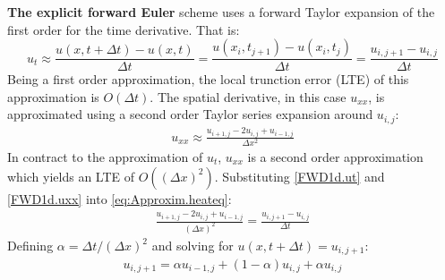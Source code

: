 \documentclass[%
oneside,                 %
final,                   %
10pt]{article}
\begin{document}
\textbf{The explicit forward Euler} scheme uses a forward Taylor expansion of the first order for the time derivative. That is\citep[p. 305]{HJ15}:
\begin{equation}
u_{t} \approx \frac{u(x, t +\Delta t)- u(x,t)}{\Delta t} =\frac{u(x_i, t_{j+1})- u(x_i,t_j)}{\Delta t} =\frac{u_{i,j+1}- u_{i,j}}{\Delta t} \label{FWD1d.ut}
\end{equation}
Being a first order approximation, the local trunction error (LTE) of this approximation is $O(\Delta t)$. The spatial derivative, in this case $u_{xx}$, is approximated using a second order Taylor series expansion around $u_{i,j}$:
\begin{align}
u_{xx} \approx \frac{u_{i+1,j} -2u_{i,j}+u_{i-1,j}}{\Delta x^2} \label{FWD1d.uxx}
\end{align}
In contract to the approximation of $u_t$, $u_{xx}$ is a second order approximation which yields an LTE of $O((\Delta x)^2)$. Substituting \eqref{FWD1d.ut} and \eqref{FWD1d.uxx} into \eqref{eq:Approxim.heateq}:
\begin{align*}
\frac{u_{i+1,j} -2u_{i,j}+u_{i-1,j}}{(\Delta x)^2}=\frac{u_{i,j+1}- u_{i,j}}{\Delta t} 
\end{align*}
Defining $\alpha=\Delta t/(\Delta x)^2$ and solving for $u(x,t+\Delta t)=u_{i,j+1}$:
\begin{align}
u_{i,j+1}= \alpha u_{i-1,j}+(1-\alpha)u_{i,j}+\alpha u_{i,j} \label{eq:Approximation.FWDnew}
\end{align}
\end{document}
